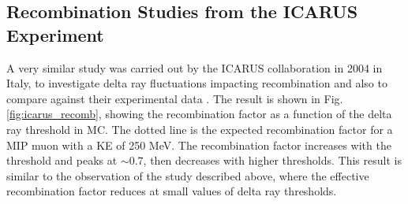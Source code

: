 %

\subsection{Recombination Studies from the ICARUS Experiment}
\label{sec:icarus}


A very similar study was carried out by the ICARUS collaboration in 2004 in Italy, to investigate delta ray fluctuations impacting recombination and also to compare against their experimental data \cite{icarus_recomb}. 
The result is shown in Fig. \ref{fig:icarus_recomb}, showing the recombination factor as a function of the delta ray threshold in MC. 
The dotted line is the expected recombination factor for a MIP muon with a KE of 250 MeV.
The recombination factor increases with the threshold and peaks at $\sim0.7$, then decreases with higher thresholds. 
This result is similar to the observation of the study described above, where the effective recombination factor reduces at small values of delta ray thresholds.

